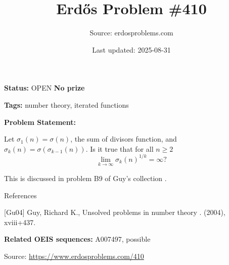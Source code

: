\documentclass{article}
\title{Erd\H{o}s Problem \#410}
\date{Last updated: 2025-08-31}
\author{Source: erdosproblems.com}
\begin{document}
\maketitle

\noindent\textbf{Status:} OPEN \quad \textbf{No prize}

\noindent\textbf{Tags:} number theory, iterated functions

\medskip

\noindent\textbf{Problem Statement:}

Let $\sigma_1(n)=\sigma(n)$, the sum of divisors function, and $\sigma_k(n)=\sigma(\sigma_{k-1}(n))$. Is it true that for all $n\geq 2$\[\lim_{k\to \infty} \sigma_k(n)^{1/k}=\infty?\]




This is discussed in problem B9 of Guy's collection \cite{Gu04}.




References

[Gu04] Guy, Richard K., Unsolved problems in number theory . (2004), xviii+437.

\noindent\textbf{Related OEIS sequences:} A007497, possible


\bigskip
\noindent\small{Source: \url{https://www.erdosproblems.com/410}}
\end{document}
